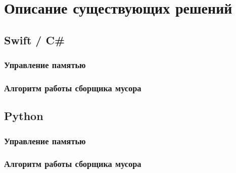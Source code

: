 \chapter{Описание существующих решений}

\section{Swift / C\#}
\subsection{Управление памятью}
\subsection{Алгоритм работы сборщика мусора}
%
%
%
%
%
%
%
%
%
%
%
%





\section{Python}
\subsection{Управление памятью}
\subsection{Алгоритм работы сборщика мусора}

%
%
%
%
%
%
%
%
%
%
%
%





